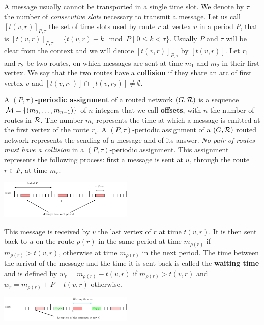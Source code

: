 \documentclass[10pt, conference, letterpaper]{IEEEtran}
\begin{document}
      A message usually cannot be transported in a single time slot. We denote by $\tau$ the number 
      of \emph{consecutive slots} necessary to transmit a message. Let us call $[t(v,r)]_{P,\tau}$ the set of time slots used by route $r$ at vertex $v$ in a period $P$, that is $[t(v,r)]_{P,\tau} = \{t(v,r) + k \mod P \mid 0 \leq k < \tau \}$. Usually $P$ and $\tau$ will be clear from the context and we will denote $[t(v,r)]_{P,\tau}$ by $[t(v,r)]$.
      Let $r_1$ and $r_2$ be two routes, on which messages are sent at time $m_1$ and $m_2$ in their first vertex.
      We say that the two routes have a {\bf collision} if they share an arc of first vertex $v$ and $[t(v,r_{1})] \cap [t(v,r_{2})] \neq \emptyset$.
      
         A {\bf $(P,\tau)$-periodic assignment} of a routed network $(G,\cal R)$ is a sequence  ${\cal M}=\{(m_0, \ldots ,m_{n-1})\}$ of $n$ integers that we call {\bf offsets}, with $n$ the number of routes in $\cal R$. The number $m_{i}$ represents the time at which a message is emitted at the first vertex of the route $r_{i}$. A $(P,\tau)$-periodic assignment of a $(G,{\cal R})$ routed network represents the sending of a message and of its answer. \emph{No pair of routes must have a collision} in a $(P,\tau)$-periodic assignment.
   This assignment represents the following process: first a message is sent at $u$, through the route $r \in F$, at time $m_r$.
       
      
      \begin{center}
     \hspace{-0.5cm} \includegraphics[width=0.48\textwidth]{rrh.pdf}
      \end{center}
      
      

      This message is received by $v$ the last vertex of $r$ at time $t(v,r)$. It is then sent back to $u$ on the route $\rho(r)$ in the same period at time $m_{\rho(r)}$ if $m_{\rho(r)} > t(v,r)$, otherwise at time $m_{\rho(r)}$ in the next period. The time between the arrival of the message and the time it is sent back is called the \textbf{waiting time} and is defined by $w_r = m_{\rho(r)} - t(v,r)$ if $m_{\rho(r)} > t(v,r)$ and $w_r = m_{\rho(r)} + P - t(v,r)$ otherwise.
 
       \begin{center}
     \hspace{-0.5cm} \includegraphics[width=0.48\textwidth]{BBU.pdf}
      \end{center}
     
\end{document}
